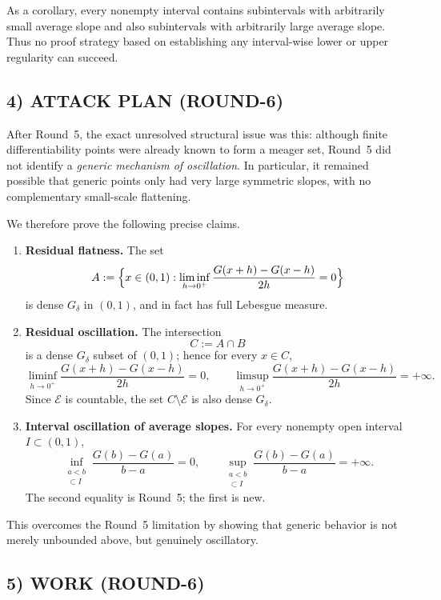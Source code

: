 As a corollary, every nonempty interval contains subintervals with arbitrarily small average slope and also subintervals with arbitrarily large average slope. Thus no proof strategy based on establishing any interval-wise lower or upper regularity can succeed.

\subsection{4) ATTACK PLAN (ROUND-6)}

After Round~5, the exact unresolved structural issue was this: although finite differentiability points were already known to form a meager set, Round~5 did not identify a \emph{generic mechanism of oscillation}. In particular, it remained possible that generic points only had very large symmetric slopes, with no complementary small-scale flattening.

We therefore prove the following precise claims.

\begin{enumerate}
\item \textbf{Residual flatness.}
The set
\[
A:=\Bigl\{x\in(0,1):\liminf_{h\to0^+}\frac{G(x+h)-G(x-h)}{2h}=0\Bigr\}
\]
is dense $G_\delta$ in $(0,1)$, and in fact has full Lebesgue measure.

\item \textbf{Residual oscillation.}
The intersection
\[
C:=A\cap B
\]
is a dense $G_\delta$ subset of $(0,1)$; hence for every $x\in C$,
\[
\liminf_{h\to0^+}\frac{G(x+h)-G(x-h)}{2h}=0,
\qquad
\limsup_{h\to0^+}\frac{G(x+h)-G(x-h)}{2h}=+\infty.
\]
Since $\mathcal E$ is countable, the set $C\setminus\mathcal E$ is also dense $G_\delta$.

\item \textbf{Interval oscillation of average slopes.}
For every nonempty open interval $I\subset(0,1)$,
\[
\inf_{\substack{a<b\\ [a,b]\subset I}}\frac{G(b)-G(a)}{b-a}=0,
\qquad
\sup_{\substack{a<b\\ [a,b]\subset I}}\frac{G(b)-G(a)}{b-a}=+\infty.
\]
The second equality is Round~5; the first is new.
\end{enumerate}

This overcomes the Round~5 limitation by showing that generic behavior is not merely unbounded above, but genuinely oscillatory.

\subsection{5) WORK (ROUND-6)}

